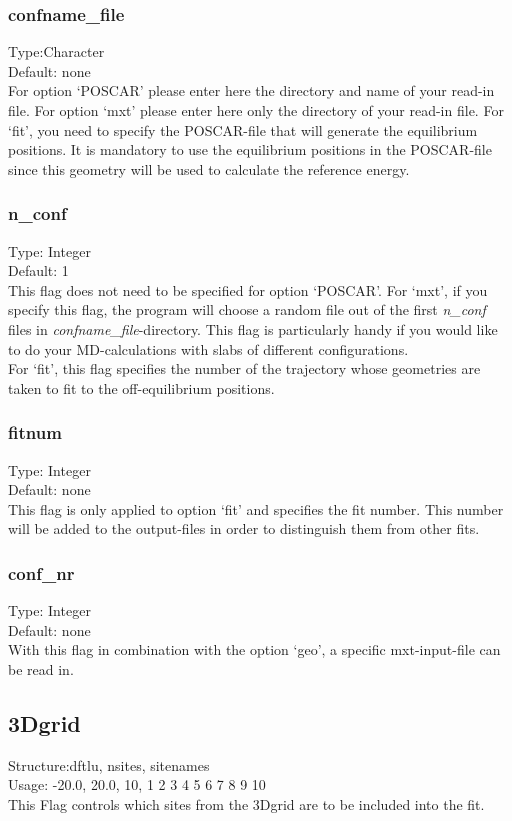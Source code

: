 \documentclass[twoside, 11pt, titlepage, captions=nooneline, a4paper, headsepline]{scrbook}%
\begin{document}
\subsubsection*{confname\_file}
Type:Character\\
Default: none\\
For option `POSCAR' please enter here the directory and name of your read-in file. For option `mxt' please enter here only the directory of your read-in file. For `fit', you need to specify the POSCAR-file that will generate the equilibrium positions. It is mandatory to use the equilibrium positions in the POSCAR-file since this geometry will be used to calculate the reference energy.
\subsubsection*{n\_conf}
Type: Integer\\
Default: 1\\
This flag does not need to be specified for option `POSCAR'.
For `mxt', if you specify this flag, the program will choose a random file out of the first \emph{n\_conf} files in \emph{confname\_file}-directory. This flag is particularly handy if you would like to do your MD-calculations with slabs of different configurations.\\
For `fit', this flag specifies the number of the trajectory whose geometries are taken to fit to the off-equilibrium positions.
\subsubsection*{fitnum}
Type: Integer\\
Default: none\\
This flag is only applied to option `fit' and specifies the fit number. This number will be added to the output-files in order to distinguish them from other fits.
\subsubsection*{conf\_nr}
Type: Integer\\
Default: none\\
With this flag in combination with the option `geo', a specific mxt-input-file can be read in.

\subsection*{3Dgrid}
Structure:dftlu, nsites, sitenames\\
Usage: -20.0, 20.0, 10, 1 2 3 4 5 6 7 8 9 10\\
This Flag controls which sites from the 3Dgrid are to be included into the fit.
\end{document}
